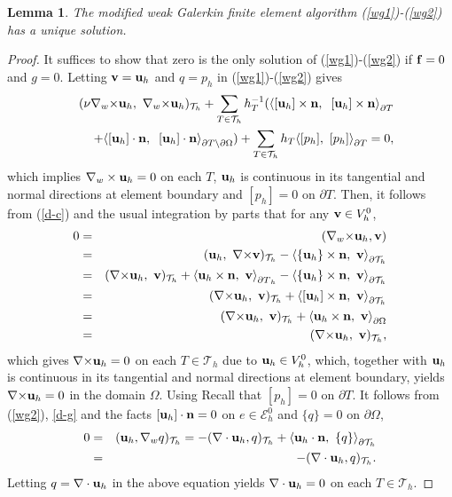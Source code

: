 \documentclass[11pt]{amsart}
\newtheorem{lemma}[theorem]{Lemma}
\newcommand{\bu}{{\bf u}}
\newcommand{\bv}{{\bf v}}
\newcommand{\curl}{{\nabla\times}}
\newcommand{\cw}{{\nabla_w\times}}
\def\T{{\mathcal T}}
\def\E{{\mathcal E}}
\def\pT{{\partial T}}
\def\l{{\langle}}
\def\r{{\rangle}}
\def\bbf{{\bf f}}
\def\bn{{\bf n}}
\def\cal#1{\mathcal{#1}}
\begin{document}
\begin{lemma}\label{lemma-ue}
The modified weak Galerkin finite element algorithm (\ref{wg1})-(\ref{wg2})
has a unique solution.
\end{lemma}

\smallskip

\begin{proof}
It suffices to show that zero is the only solution of
(\ref{wg1})-(\ref{wg2}) if $\bbf=0$ and $g=0$.
 Letting $\bv=\bu_h$
and $q=p_h$ in (\ref{wg1})-(\ref{wg2}) 
gives
\begin{eqnarray*}
 & & (\nu\cw\bu_h,\ \cw\bu_h)_{\T_h}  + \sum_{T\in {\cal T}_h}h^{-1}_T (\l [\bu_h]\times\bn,\;\;[\bu_h]\times\bn\r_\pT \\
  & &\quad +\l
[\bu_h]\cdot\bn,\;\;[\bu_h]\cdot\bn\r_{\pT\setminus {\partial\Omega}}) 
    + \sum_{T\in\T_h}h_T\l [p_h],\ [p_h]\r_\pT=0,
\end{eqnarray*}
which implies $\nabla_w\times\bu_h=0$ on each $T$, $\bu_h$ is continuous in its tangential and normal directions at element boundary and
 $[p_h]=0$ on $\pT$.
Then, it follows from (\ref{d-c}) and the usual 
integration by parts that for any $\bv\in V_h^0$,
\begin{eqnarray*}
0&=&(\cw\bu_h,\bv)\\
&=&(\bu_h,\ \curl\bv)_{\T_h}-\l\{\bu_h\}\times\bn,\ \bv\r_{\partial\T_h}\\
&=&(\curl\bu_h,\ \bv)_{\T_h}+\l\bu_h\times\bn,\ \bv\r_{\pT_h}-\l\{\bu_h\}\times\bn,\ \bv\r_{\partial\T_h}\\
&=&(\curl\bu_h,\ \bv)_{\T_h}+\l [\bu_h]\times\bn,\ \bv\r_{\partial\T_h}\\
&=&(\curl\bu_h,\ \bv)_{\T_h}+\l  \bu_h \times\bn,\ \bv\r_{\partial\Omega}\\
&=&(\curl\bu_h,\ \bv)_{\T_h},
\end{eqnarray*}
which gives $\curl\bu_h=0$ on each $T\in\T_h$ due to $\bu_h\in V_h^0$, which, together with $\bu_h$ is continuous in its tangential and normal directions at element boundary, yields $\curl\bu_h=0$ in the domain $\Omega$.  Using  Recall that  $[p_h]=0$ on $\pT$. It follows from (\ref{wg2}), \eqref{d-g} and the facts $[\bu_h]\cdot\bn=0$ on $e\in\E_h^0$ and $\{q\}=0$ on $\partial\Omega$,
\begin{eqnarray*}
0&=&(\bu_h,\nabla_w q)_{\T_h}=-(\nabla\cdot\bu_h, q)_{\T_h}+\l\bu_h\cdot\bn,\ \{q\}\r_{\partial\T_h}\\
&=&-(\nabla\cdot\bu_h, q)_{\T_h}.
\end{eqnarray*}
Letting $q=\nabla\cdot\bu_h$ in the above equation
yields $\nabla\cdot \bu_h=0$ on each $T\in\T_h$.


\end{proof}
\end{document}
